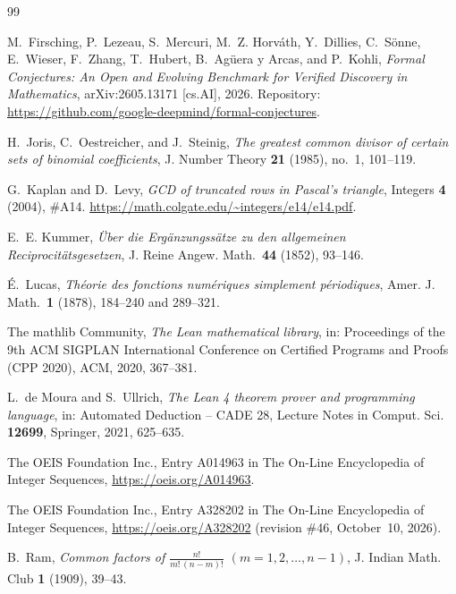 \documentclass[11pt]{amsart}
\theoremstyle{plain}
\theoremstyle{definition}
\begin{document}
{\small
\begin{thebibliography}{99}

M.~Firsching, P.~Lezeau, S.~Mercuri, M.~Z. Horv\'ath, Y.~Dillies, C.~S\"onne, E.~Wieser, F.~Zhang, T.~Hubert, B.~Ag\"uera y Arcas, and P.~Kohli, \emph{Formal Conjectures: An Open and Evolving Benchmark for Verified Discovery in Mathematics}, arXiv:2605.13171 [cs.AI], 2026. Repository: \url{https://github.com/google-deepmind/formal-conjectures}.

H.~Joris, C.~Oestreicher, and J.~Steinig, \emph{The greatest common divisor of certain sets of binomial coefficients}, J. Number Theory \textbf{21} (1985), no.~1, 101--119.

G.~Kaplan and D.~Levy, \emph{GCD of truncated rows in Pascal's triangle}, Integers \textbf{4} (2004), \#A14. \url{https://math.colgate.edu/~integers/e14/e14.pdf}.

E.~E. Kummer, \emph{\"Uber die Erg\"anzungss\"atze zu den allgemeinen Reciprocit\"atsgesetzen}, J. Reine Angew. Math.\ \textbf{44} (1852), 93--146.

\'E.~Lucas, \emph{Th\'eorie des fonctions num\'eriques simplement p\'eriodiques}, Amer. J. Math.\ \textbf{1} (1878), 184--240 and 289--321.

The mathlib Community, \emph{The Lean mathematical library}, in: Proceedings of the 9th ACM SIGPLAN International Conference on Certified Programs and Proofs (CPP 2020), ACM, 2020, 367--381.

L.~de Moura and S.~Ullrich, \emph{The Lean 4 theorem prover and programming language}, in: Automated Deduction -- CADE 28, Lecture Notes in Comput. Sci. \textbf{12699}, Springer, 2021, 625--635.

The OEIS Foundation Inc., Entry A014963 in The On-Line Encyclopedia of Integer Sequences, \url{https://oeis.org/A014963}.

The OEIS Foundation Inc., Entry A328202 in The On-Line Encyclopedia of Integer Sequences, \url{https://oeis.org/A328202} (revision \#46, October~10, 2026).

B.~Ram, \emph{Common factors of $\frac{n!}{m!\,(n-m)!}$ $(m=1,2,\dots,n-1)$}, J. Indian Math. Club \textbf{1} (1909), 39--43.

\end{thebibliography}
}
\end{document}
